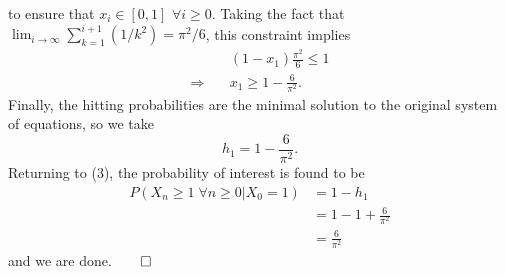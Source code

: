 \documentclass[11pt, letterpaper]{article}
\begin{document}
    to ensure that $x_i\in[0,1]$ $\forall i\geq 0$. Taking the fact that $\lim_{i\rightarrow\infty}\sum_{k=1}^{i+1}(1/k^2)=\pi^2/6$, this constraint implies
    \begin{align*}
        &(1-x_1)\frac{\pi^2}{6}\leq 1\\
        \Rightarrow\quad&x_1\geq 1-\frac{6}{\pi^2}.
    \end{align*}
    Finally, the hitting probabilities are the minimal solution to the original system of equations, so we take
    \[h_1=1-\frac{6}{\pi^2}.\]
    Returning to (3), the probability of interest is found to be
    \begin{align*}
        P(X_n\geq 1\;\forall n\geq 0|X_0=1)&=1-h_1\\
        &=1-1+\frac{6}{\pi^2}\\
        &=\frac{6}{\pi^2}
    \end{align*}
    and we are done.\hfill{$\qed$}\\[10pt]
\end{document}
